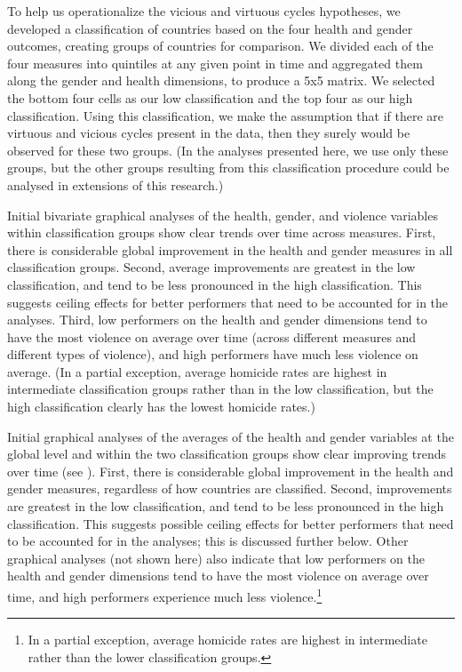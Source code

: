 \documentclass[12pt]{article}
\begin{document}
To help us operationalize the vicious and virtuous cycles hypotheses, we developed a classification of countries based on the four health and gender outcomes, creating groups of countries for comparison. We divided each of the four measures into quintiles at any given point in time and aggregated them along the gender and health dimensions, to produce a 5x5 matrix. We selected the bottom four cells as our low classification and the top four as our high classification. Using this classification, we make the assumption that if there are virtuous and vicious cycles present in the data, then they surely would be observed for these two groups. (In the analyses presented here, we use only these groups, but the other groups resulting from this classification procedure could be analysed in extensions of this research.)

Initial bivariate graphical analyses of the health, gender, and violence variables within classification groups show clear trends over time across measures. First, there is considerable global improvement in the health and gender measures in all classification groups. Second, average improvements are greatest in the low classification, and tend to be less pronounced in the high classification. This suggests ceiling effects for better performers that need to be accounted for in the analyses.
Third, low performers on the health and gender dimensions tend to have the most violence on average over time (across different measures and different types of violence), and high performers have much less violence on average. (In a partial exception, average homicide rates are highest in intermediate classification groups rather than in the low classification, but the high classification clearly has the lowest homicide rates.)



Initial graphical analyses of the averages of the health and gender variables at the global level and within the two classification groups show clear improving trends over time (see ).
First, there is considerable global improvement in the health and gender measures, regardless of how countries are classified.
Second, improvements are greatest in the low classification, and tend to be less pronounced in the high classification.
This suggests possible ceiling effects for better performers that need to be accounted for in the analyses; this is discussed further below.
Other graphical analyses (not shown here) also indicate that low performers on the health and gender dimensions tend to have the most violence on average over time, and high performers experience much less violence.\footnote{In a partial exception, average homicide rates are highest in intermediate rather than the lower classification groups.}
\end{document}
